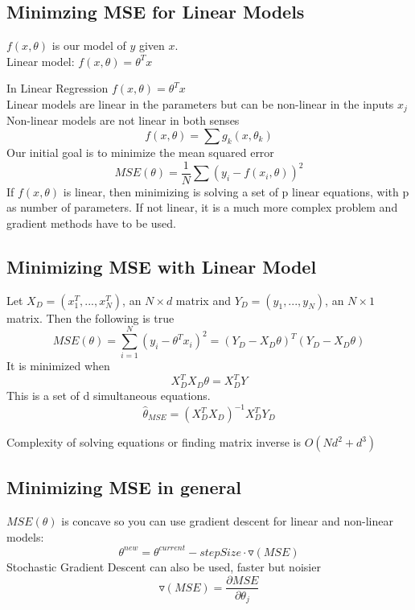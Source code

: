 \documentclass[11pt,psfig]{article}
\begin{document}
\setlength{\parskip}{1.2ex plus0.3ex minus 0.3ex}


\vfill\eject

\subsection*{Minimzing MSE for Linear Models}

$f(x,\theta)$ 	is our model of $y$ given $x$.\\

Linear model: $f(x,\theta)=\theta^T x$

In Linear Regression $f(x,\theta)=\theta^T x$\\
Linear models are linear in the parameters but can be non-linear in the inputs $x_j$\\
Non-linear models are not linear in both senses
\[
f(x,\theta)=\sum{g_k(x,\theta_k)}
\]
Our initial goal is to minimize the mean squared error
\[
MSE(\theta) = \frac{1}{N} \sum{ (y_i-f(x_i,\theta))^2 }
\]
If $f(x,\theta)$ is linear, then minimizing is solving a set of p linear equations, with p as number of parameters. If not linear, it is a much more complex problem and gradient methods have to be used. 

\subsection*{Minimizing MSE with Linear Model}

Let $X_D=(x_1^T,...,x_N^T)$, an $N \times d$ matrix and $Y_D=(y_1,...,y_N)$, an $N \times 1$ matrix.
Then the following is true
\[
MSE(\theta) = \sum_{i=1}^N{(y_i-\theta^T x_i)^2} = (Y_D-X_D\theta)^T(Y_D-X_D\theta)
\]
It is minimized when
\[
X_D^T X_D \theta = X_D^T Y
\]
This is a set of d simultaneous equations.
\[
\hat{\theta}_{MSE} = (X_D^T X_D)^{-1} X_D^T Y_D
\]

Complexity of solving equations or finding matrix inverse is $O(N d^2 + d^3)$

\subsection*{Minimizing MSE in general}
$MSE(\theta)$ is concave so you can use gradient descent for linear and non-linear models:
     \[
		\theta^{new} = \theta^{current} - stepSize\cdot \triangledown(MSE)
		\]
Stochastic Gradient Descent can also be used, faster but noisier
\[
\triangledown(MSE) = \frac{\partial MSE}{\partial \theta_j}
\]
\end{document}
